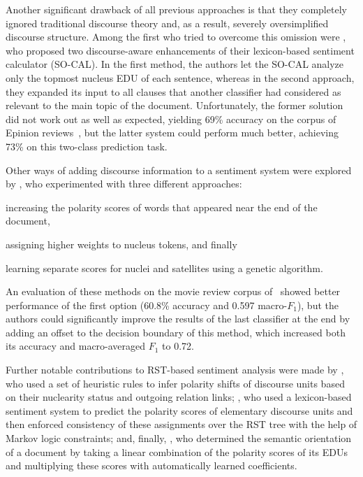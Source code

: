 \documentclass[11pt]{article}
\newcommand{\F}[0]{$F_1$}
\begin{document}
Another significant drawback of all previous approaches is that they
completely ignored traditional discourse theory and, as a result,
severely oversimplified discourse structure.  Among the first who
tried to overcome this omission were , who proposed two
discourse-aware enhancements of their lexicon-based sentiment
calculator (SO-CAL).  In the first method, the authors let the SO-CAL
analyze only the topmost nucleus EDU of each sentence, whereas in the
second approach, they expanded its input to all clauses that another
classifier had considered as relevant to the main topic of the
document.  Unfortunately, the former solution did not work out as well
as expected, yielding 69\% accuracy on the corpus of Epinion
reviews~\cite{Taboada:06}, but the latter system could perform much
better, achieving 73\% on this two-class prediction task.

Other ways of adding discourse information to a sentiment system were
explored by , who experimented with three
different approaches:
\begin{inparaenum}[(i)]
\item increasing the polarity scores of words that appeared near the
  end of the document,
\item assigning higher weights to nucleus tokens, and finally
\item learning separate scores for nuclei and satellites using a
  genetic algorithm.
\end{inparaenum}
An evaluation of these methods on the movie review corpus
of~ showed better performance of the first option
(60.8\% accuracy and 0.597 macro-\F), but the authors could
significantly improve the results of the last classifier at the end by
adding an offset to the decision boundary of this method, which
increased both its accuracy and macro-averaged \F{} to 0.72.

Further notable contributions to RST-based sentiment analysis were
made by , who used a set of heuristic rules to infer
polarity shifts of discourse units based on their nuclearity status
and outgoing relation links; , who used a lexicon-based
sentiment system to predict the polarity scores of elementary
discourse units and then enforced consistency of these assignments
over the RST tree with the help of Markov logic constraints; and,
finally, , who determined the semantic orientation of a
document by taking a linear combination of the polarity scores of its
EDUs and multiplying these scores with automatically learned
coefficients.
\end{document}

